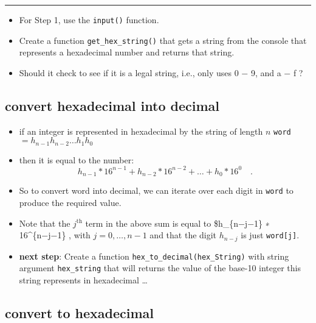 \documentclass[]{tufte-handout}
\providecommand{\tightlist}{%
  \setlength{\itemsep}{0pt}\setlength{\parskip}{0pt}}
\begin{document}
\begin{center}\rule{0.5\linewidth}{\linethickness}\end{center}

\begin{itemize}
\tightlist
\item
  For Step 1, use the \texttt{input()} function.
\item
  Create a function \texttt{get\_hex\_string()} that gets a string from
  the console that represents a hexadecimal number and returns that
  string.
\item
  Should it check to see if it is a legal string, i.e., only uses 0 − 9,
  and a − f ?
\end{itemize}

\subsection{convert hexadecimal into
decimal}\label{convert-hexadecimal-into-decimal}

\begin{itemize}
\tightlist
\item
  if an integer is represented in hexadecimal by the string of length
  \(n\) \texttt{word} \(= h_{n−1} h_{n−2} \dots h_1 h_0\)
\item
  then it is equal to the number: \[
  h_{n−1} * 16^{n−1} + h_{n−2} * 16^{n−2} + \dots + h_0 * 16^0 \quad .
  \]
\item
  So to convert word into decimal, we can iterate over each digit in
  \texttt{word} to produce the required value.
\item
  Note that the \(j^{\textrm{th}}\) term in the above sum is equal to
  \$h\_\{n−j−1\} ∗ 16\^{}\{n−j−1\} , with \(j = 0, \dots, n − 1\) and
  that the digit \(h_{n−j}\) is just \texttt{word{[}j{]}}.
\item
  \textbf{next step}: Create a function
  \texttt{hex\_to\_decimal(hex\_String)} with string argument
  \texttt{hex\_string} that will returns the value of the base-10
  integer this string represents in hexadecimal \ldots{}
\end{itemize}

\subsection{convert to hexadecimal}\label{convert-to-hexadecimal}
\end{document}
